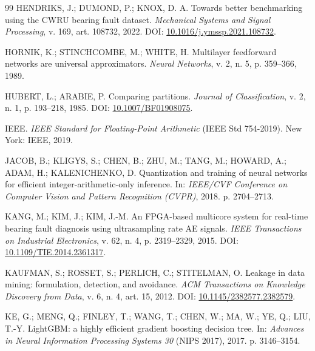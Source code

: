 \documentclass[12pt]{article}
\begin{document}
{\begin{thebibliography}{99}
	HENDRIKS, J.; DUMOND, P.; KNOX, D. A.
	\newblock Towards better benchmarking using the CWRU bearing fault dataset.
	\newblock \emph{Mechanical Systems and Signal Processing}, v. 169, art. 108732, 2022.
	\newblock DOI: \href{https://doi.org/10.1016/j.ymssp.2021.108732}{10.1016/j.ymssp.2021.108732}.

	HORNIK, K.; STINCHCOMBE, M.; WHITE, H.
	\newblock Multilayer feedforward networks are universal approximators.
	\newblock \emph{Neural Networks}, v. 2, n. 5, p. 359--366, 1989.

	HUBERT, L.; ARABIE, P.
	\newblock Comparing partitions.
	\newblock \emph{Journal of Classification}, v. 2, n. 1, p. 193--218, 1985.
	\newblock DOI: \href{https://doi.org/10.1007/BF01908075}{10.1007/BF01908075}.

	IEEE.
	\newblock \emph{IEEE Standard for Floating-Point Arithmetic} (IEEE Std 754-2019).
	\newblock New York: IEEE, 2019.

	JACOB, B.; KLIGYS, S.; CHEN, B.; ZHU, M.; TANG, M.; HOWARD, A.; ADAM, H.; KALENICHENKO, D.
	\newblock Quantization and training of neural networks for efficient integer-arithmetic-only inference.
	\newblock In: \emph{IEEE/CVF Conference on Computer Vision and Pattern Recognition (CVPR)}, 2018. p. 2704--2713.

	KANG, M.; KIM, J.; KIM, J.-M.
	\newblock An FPGA-based multicore system for real-time bearing fault diagnosis using ultrasampling rate AE signals.
	\newblock \emph{IEEE Transactions on Industrial Electronics}, v. 62, n. 4, p. 2319--2329, 2015.
	\newblock DOI: \href{https://doi.org/10.1109/TIE.2014.2361317}{10.1109/TIE.2014.2361317}.

	KAUFMAN, S.; ROSSET, S.; PERLICH, C.; STITELMAN, O.
	\newblock Leakage in data mining: formulation, detection, and avoidance.
	\newblock \emph{ACM Transactions on Knowledge Discovery from Data}, v. 6, n. 4, art. 15, 2012.
	\newblock DOI: \href{https://doi.org/10.1145/2382577.2382579}{10.1145/2382577.2382579}.

	KE, G.; MENG, Q.; FINLEY, T.; WANG, T.; CHEN, W.; MA, W.; YE, Q.; LIU, T.-Y.
	\newblock LightGBM: a highly efficient gradient boosting decision tree.
	\newblock In: \emph{Advances in Neural Information Processing Systems 30} (NIPS 2017), 2017. p. 3146--3154.


\end{thebibliography}}
\end{document}
